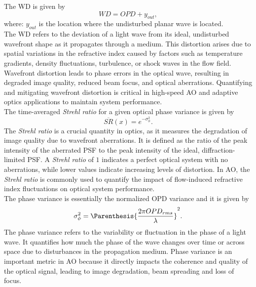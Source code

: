     The \gls{WD} is given by 
    \begin{equation}\label{eq:WD}
        WD = OPD + y_{out}, 
    \end{equation}
    where: $y_{out}$ is the location where the undisturbed planar wave is
    located. \\

    The \gls{WD} refers to the deviation of a light wave from its ideal,
    undisturbed wavefront shape as it propagates through a medium. This
    distortion arises due to spatial variations in the refractive index caused
    by factors such as temperature gradients, density fluctuations, turbulence,
    or shock waves in the flow field. Wavefront distortion leads to phase
    errors in the optical wave, resulting in degraded image quality, reduced
    beam focus, and optical aberrations. Quantifying and mitigating wavefront
    distortion is critical in high-speed \gls{AO} and adaptive optics
    applications to maintain system performance.\\

    The time-averaged \textit{Strehl ratio} for a given optical phase variance is given
    by 
    \begin{equation}\label{eq:strehlRatio}
        \overline{SR}(x) = e^{-\sigma_{\phi}^2}.
    \end{equation}
    The \textit{Strehl ratio} is a crucial quantity in optics, as it measures the
degradation of image quality due to wavefront aberrations. It is defined as the
ratio of the peak intensity of the aberrated \gls{PSF} to the
peak intensity of the ideal, diffraction-limited \gls{PSF}. A \textit{Strehl ratio}
of $1$
indicates a perfect optical system with no aberrations, while lower values
indicate increasing levels of distortion. In \gls{AO}, the \textit{Strehl
ratio} is
commonly used to quantify the impact of flow-induced refractive index
fluctuations on optical system performance.\\

    The phase variance is essentially the normalized \gls{OPD} variance and it
    is given by
    \begin{equation}\label{eq:phaseVariance}
        \sigma_{\phi}^2 = \Parenthesis{\frac{2\pi OPD_{rms}}{\lambda} }^2.
    \end{equation}
The phase variance refers to the variability or fluctuation in the phase of a
light wave. It quantifies how much the phase of the wave changes over time or
across space due to disturbances in the propagation medium. Phase variance is
an important metric in \gls{AO} because it directly impacts the coherence and
quality of the optical signal, leading to image degradation, beam spreading and
loss of focus.\\

